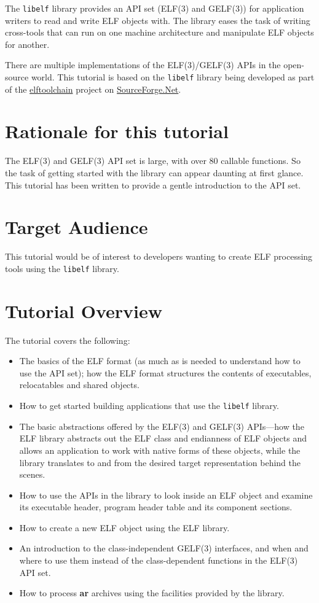 \documentclass[a4paper,pdftex]{book}
\newcommand{\elftoolchain}{\href{http://elftoolchain.sourceforge.net/}%
    {elftoolchain}\xspace}
\newcommand{\library}[1]{\texttt{#1}}
\newcommand{\tool}[1]{\textbf{#1}}
\begin{document}
The \library{libelf} library provides an API set (ELF(3) and GELF(3))
for application writers to read and write ELF objects with.
\index{libelf@\library{libelf}!purpose of} The library eases the task
of writing cross-tools that can run on one machine architecture and
manipulate ELF objects for another.

There are multiple implementations of the ELF(3)/GELF(3) APIs in the
open-source world.  This tutorial is based on the \library{libelf}
library being developed as part of the \elftoolchain project on
\href{http://sourceforge.net/}{SourceForge.Net}.

\section*{Rationale for this tutorial}

The ELF(3) and GELF(3) API set is large, with over 80 callable
functions.  So the task of getting started with the library can appear
daunting at first glance.  This tutorial has been written to provide a
gentle introduction to the API set.

\section*{Target Audience}

This tutorial would be of interest to developers wanting to create ELF
processing tools using the \library{libelf} library.

\section{Tutorial Overview}

The tutorial covers the following:

\begin{itemize}
\item The basics of the ELF format (as much as is needed to understand
  how to use the API set); how the ELF format structures the contents
  of executables, relocatables and shared objects.
\item How to get started building applications that use the
  \library{libelf} library.
\item The basic abstractions offered by the ELF(3) and GELF(3)
  APIs---how the ELF library abstracts out the ELF class and
  endianness of ELF objects and allows an application to work with
  native forms of these objects, while the library translates to and
  from the desired target representation behind the scenes.
\item How to use the APIs in the library to look inside an ELF object
  and examine its executable header, program header table and its
  component sections.
\item How to create a new ELF object using the ELF library.
\item An introduction to the class-independent GELF(3) interfaces, and
  when and where to use them instead of the class-dependent functions
  in the ELF(3) API set.
\item How to process \tool{ar} archives using the facilities provided
  by the library.
\end{itemize}
\end{document}
